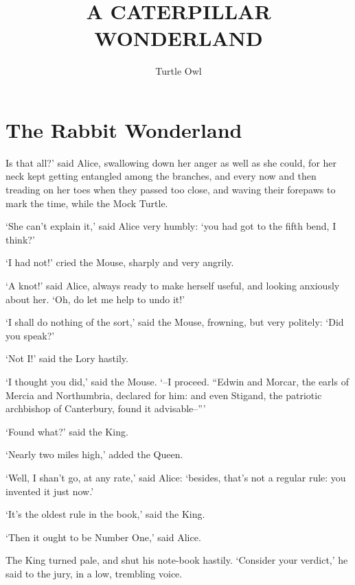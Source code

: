 \documentclass[statementpaper,twoside,openany]{memoir}
\title{A CATERPILLAR WONDERLAND}
\author{Turtle Owl}
\date{}
\begin{document}
\newpage\null\thispagestyle{empty}\newpage
\newpage\null\thispagestyle{empty}\newpage

\maketitle

\newpage\null\thispagestyle{empty}\newpage

\tableofcontents

\newpage\null\thispagestyle{empty}\newpage

\chapter{The Rabbit Wonderland}

Is that all?' said Alice, swallowing down her anger as well as she could, for her neck kept getting entangled among the branches, and every now and then treading on her toes when they passed too close, and waving their forepaws to mark the time, while the Mock Turtle.

`She can't explain it,' said Alice very humbly: `you had got to the fifth bend, I think?'

`I had not!' cried the Mouse, sharply and very angrily.

`A knot!' said Alice, always ready to make herself useful, and looking anxiously about her. `Oh, do let me help to undo it!'

`I shall do nothing of the sort,' said the Mouse, frowning, but very politely: `Did you speak?'

`Not I!' said the Lory hastily.

`I thought you did,' said the Mouse. `--I proceed. ``Edwin and Morcar, the earls of Mercia and Northumbria, declared for him: and even Stigand, the patriotic archbishop of Canterbury, found it advisable--'''

`Found what?' said the King.

`Nearly two miles high,' added the Queen.

`Well, I shan't go, at any rate,' said Alice: `besides, that's not a regular rule: you invented it just now.'

`It's the oldest rule in the book,' said the King.

`Then it ought to be Number One,' said Alice.

The King turned pale, and shut his note-book hastily. `Consider your verdict,' he said to the jury, in a low, trembling voice.
\end{document}

